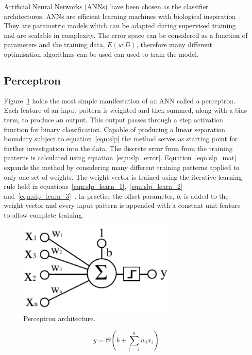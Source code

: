 \documentclass{ecsarticle}     %
\begin{document}
Artificial Neural Networks (ANNs) have been chosen as the classifier architectures.
ANNs are efficient learning machines with biological inspiration~\citep{bishop06pattern}. 
They are parametric models which can be adapted during supervised training and are scalable in complexity.
The error space can be considered as a function of parameters and the training data, $E(w|D)$, therefore many different optimisation algorithms can be used can used to train the model. 



\subsection{Perceptron}
\label{sec:perceptron}

Figure~\ref{fig:slp} holds the most simple manifestation of an ANN called a perceptron.
Each feature of an input pattern is weighted and then summed, along with a bias term, to produce an output.
This output passes through a step activation function for binary classification.
Capable of producing a linear separation boundary subject to equation~\eqref{eqn:slp} the method serves as starting point for further investigation into the data.
The discrete error from from the training patterns is calculated using equation~\eqref{eqn:slp_error}.
Equation~\eqref{eqn:slp_mat} expands the method by considering many different training patterns applied to only one set of weights.
The weight vector is trained using the iterative learning rule held in equations~\eqref{eqn:slp_learn_1},~\eqref{eqn:slp_learn_2} and~\eqref{eqn:slp_learn_3}~\citep{info05mackay}.
In practice the offset parameter, $b$, is added to the weight vector and every input pattern is appended with a constant unit feature to allow complete training.

\begin{figure}[ht]
   \centering
    \includegraphics[width = 8cm]{SLP.pdf}
   \caption{Perceptron architecture.}
   \label{fig:slp}
\end{figure}

\begin{equation}
   y = \Theta \left(b + \sum_{i=1}^{n} w_i x_i \right)
   \label{eqn:slp}
\end{equation}
\end{document}
